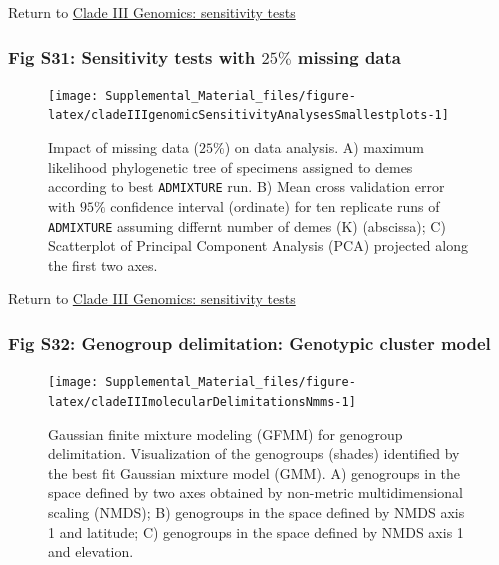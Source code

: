 \documentclass[
  11pt,
]{article}
\begin{document}
Return to \protect\hyperlink{sensitivity-tests-2}{Clade III Genomics: sensitivity tests}
\pagebreak

\hypertarget{fig-s31-sensitivity-tests-with-25-missing-data}{%
\subsubsection{\texorpdfstring{Fig S31: Sensitivity tests with \(25\%\) missing data}{Fig S31: Sensitivity tests with 25\textbackslash\% missing data}}\label{fig-s31-sensitivity-tests-with-25-missing-data}}

\begin{figure}
\texttt{[image: Supplemental\_Material\_files/figure-latex/cladeIIIgenomicSensitivityAnalysesSmallestplots-1]} \caption{Impact of missing data ($25\%$) on data analysis. A) maximum likelihood phylogenetic tree of specimens assigned to demes according to best \texttt{ADMIXTURE} run. B) Mean cross validation error with $95\%$ confidence interval (ordinate) for ten replicate runs of \texttt{ADMIXTURE} assuming differnt number of demes (K) (abscissa); C) Scatterplot of Principal Component Analysis (PCA) projected along the first two axes.}\label{fig:cladeIIIgenomicSensitivityAnalysesSmallestplots}
\end{figure}

Return to \protect\hyperlink{sensitivity-tests-2}{Clade III Genomics: sensitivity tests}
\pagebreak

\hypertarget{fig-s32-genogroup-delimitation-genotypic-cluster-model}{%
\subsubsection{Fig S32: Genogroup delimitation: Genotypic cluster model}\label{fig-s32-genogroup-delimitation-genotypic-cluster-model}}

\begin{figure}
\texttt{[image: Supplemental\_Material\_files/figure-latex/cladeIIImolecularDelimitationsNmms-1]} \caption{Gaussian finite mixture modeling (GFMM) for genogroup delimitation. Visualization of the genogroups (shades) identified by the best fit Gaussian mixture model (GMM). A) genogroups in the space defined by two axes obtained by non-metric multidimensional scaling (NMDS); B) genogroups in the space defined by NMDS axis 1 and latitude; C) genogroups in the space defined by NMDS axis 1 and elevation.}\label{fig:cladeIIImolecularDelimitationsNmms}
\end{figure}
\end{document}
